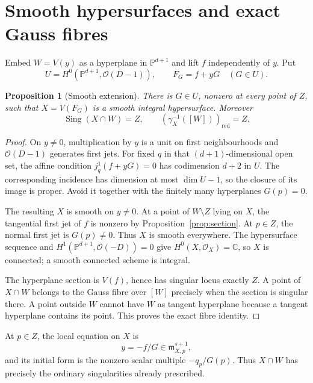 \documentclass[11pt,a4paper]{article}
\newtheorem{proposition}[theorem]{Proposition}
\theoremstyle{definition}
\newcommand{\PP}{\mathbb P}
\newcommand{\cO}{\mathcal O}
\newcommand{\m}{\mathfrak m}
\newcommand{\Sing}{\operatorname{Sing}}
\begin{document}
\section{Smooth hypersurfaces and exact Gauss fibres}

Embed $W=V(y)$ as a hyperplane in $\PP^{d+1}$ and lift $f$ independently of
$y$.  Put
\[
 U=H^0(\PP^{d+1},\cO(D-1)),\qquad F_G=f+yG\quad(G\in U).
\]

\begin{proposition}[Smooth extension]\label{prop:extension}
There is $G\in U$, nonzero at every point of $Z$, such that
$X=V(F_G)$ is a smooth integral hypersurface.  Moreover
\[
 \Sing(X\cap W)=Z,
 \qquad
 (\gamma_X^{-1}([W]))_{\mathrm{red}}=Z.
\]
\end{proposition}

\begin{proof}
On $y\ne0$, multiplication by $y$ is a unit on first neighbourhoods and
$\cO(D-1)$ generates first jets.  For fixed $q$ in that $(d+1)$-dimensional
open set, the affine condition $j_q^1(f+yG)=0$ has codimension $d+2$ in $U$.
The corresponding incidence has dimension at most $\dim U-1$, so the closure
of its image is proper.  Avoid it together with the finitely many hyperplanes
$G(p)=0$.

The resulting $X$ is smooth on $y\ne0$.  At a point of $W\setminus Z$ lying
on $X$, the tangential first jet of $f$ is nonzero by
Proposition~\ref{prop:section}.  At $p\in Z$, the normal first jet is
$G(p)\ne0$.  Thus $X$ is smooth everywhere.  The hypersurface sequence and
$H^1(\PP^{d+1},\cO(-D))=0$ give $H^0(X,\cO_X)=\mathbb C$, so $X$ is
connected; a smooth connected scheme is integral.

The hyperplane section is $V(f)$, hence has singular locus exactly $Z$.
A point of $X\cap W$ belongs to the Gauss fibre over $[W]$ precisely when the
section is singular there.  A point outside $W$ cannot have $W$ as tangent
hyperplane because a tangent hyperplane contains its point.  This proves the
exact fibre identity.
\end{proof}

At $p\in Z$, the local equation on $X$ is
\[
 y=-f/G\in\m_{X,p}^{s+1},
\]
and its initial form is the nonzero scalar multiple $-q_p/G(p)$.  Thus
$X\cap W$ has precisely the ordinary singularities already prescribed.
\end{document}
